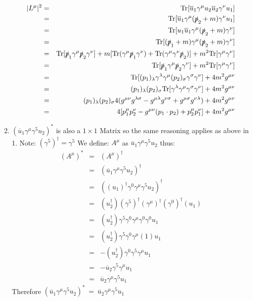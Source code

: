 \documentclass[12pt]{article}
\def \bea{\begin{eqnarray}}
\def \eea{\end{eqnarray}}
\def \Tr{{\rm Tr}}
\def \ou{\overline{u}}
\def \ga{\gamma}
\def \la{\lambda}
\def \si{\sigma}
\begin{document}
\begin{enumerate}
\bea
|L^{\mu}|^2 &=& \Tr[\ou_1 \ga^\mu u_2 \ou_2 \ga^\nu u_1] \\
&=& \Tr[\ou_1 \ga^\mu (\slashed{p}_2+m) \ga^\nu u_1]\\
&=& \Tr[u_1\ou_1 \ga^\mu (\slashed{p}_2+m) \ga^\nu]\\
&=& \Tr[(\slashed{p}_1+m) \ga^\mu (\slashed{p}_2+m) \ga^\nu]\\
&=& \Tr[\slashed{p}_1\ga^\mu \slashed{p}_2 \ga^\nu] + m[\Tr(\ga^\mu \slashed{p}_1\ga^\nu) + \Tr(\ga^\mu \ga^\nu \slashed{p}_2)] + m^2\Tr[\ga^\mu \ga^\nu]\\
&=& \Tr[\slashed{p}_1\ga^\mu \slashed{p}_2 \ga^\nu] + m^2\Tr[\ga^\mu \ga^\nu]\\
&=& \Tr[(p_1)_\la\ga^\la \ga^\mu (p_2)_\si\ga^\si \ga^\nu  ] + 4m^2g^{\mu\nu}\\
&=& (p_1)_\la (p_2)_\si \Tr[\ga^\la \ga^\mu\ga^\si \ga^\nu  ] + 4m^2g^{\mu\nu}\\
&=& (p_1)_\la(p_2)_\si 4(g^{\mu\nu}g^{\la\si} - g^{\mu\la} g^{\nu\si} + g^{\mu\si}g^{\nu\la}) + 4m^2g^{\mu\nu}\\
&=& 4[p_1^\mu p_2^\nu - g^{\mu\nu}(p_1 \cdot p_2) + p_2^\mu p_1^\nu] + 4m^2g^{\mu\nu} 
\eea

\item $(\ou_1\ga^\mu \ga^5 u_2)^*$ is also a $1\times1$ Matrix so the same reasoning applies as above in 1. Note: $(\ga^5)^\dag = \ga^5$
We define: $A^\mu$ as $\ou_1\ga^\mu\ga^5 u_2$ thus:
\bea
(A^\mu)^* &=& (A^\mu)^\dag \\
&=&(\ou_1\ga^\mu\ga^5 u_2)^\dag \\
&=& ((u_1)^\dag\ga^0\ga^\mu\ga^5 u_2)^\dag \\
&=& (u_2^\dag)(\ga^5)^\dag(\ga^\mu)^\dag(\ga^0)^\dag(u_1) \\
&=& (u_2^\dag)\ga^5\ga^0\ga^\mu\ga^0\ga^0 u_1 \\
&=& (u_2^\dag)\ga^5\ga^0\ga^\mu(1) u_1 \\
&=& -(u_2^\dag)\ga^0\ga^5\ga^\mu u_1 \\
&=& -\ou_2\ga^5\ga^\mu u_1 \\
&=& \ou_2\ga^\mu\ga^5 u_1
\eea
%
Therefore $(\ou_1\ga^\mu \ga^5 u_2)^*~=~\ou_2 \ga^\mu \ga^5 u_1$


\end{enumerate}
\end{document}
